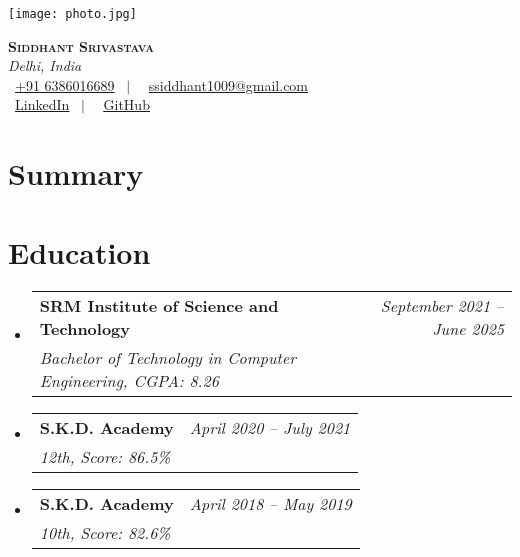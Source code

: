 \documentclass[a4paper,11pt]{article}
\makeatletter
\newcommand{\resumeSubheading}[4]{
    \vspace{-2pt}\item
        \begin{tabular*}{0.97\textwidth}[t]{l@{\extracolsep{\fill}}r}
            \textbf{#1} & #2 \\
            \textit{\small#3} & \textit{\small #4} \\
        \end{tabular*}\vspace{-10pt} %
}
\newcommand{\resumeSubHeadingListStart}{\begin{itemize}[leftmargin=0.15in, label={}]}
\newcommand{\resumeSubHeadingListEnd}{\end{itemize}}
\makeatother
\begin{document}

\begin{minipage}[c]{0.20\textwidth}
        \centering
        \texttt{[image: photo.jpg]} %
\end{minipage}%
\vrule width 1pt %
\hspace{10pt} %
\begin{minipage}[c]{0.7\textwidth}
        \raggedright %
        {\Huge \textbf{\scshape Siddhant Srivastava}} \\[7pt] %
        \textit{Delhi, India} \\[9pt] %
        \faPhone \ \href{tel:+916386016689}{+91 6386016689} \, $|$ \,
        \faEnvelope \ \href{mailto:ssiddhant1009@gmail.com}{ssiddhant1009@gmail.com} \\[5pt] %
        \faLinkedinSquare \ \href{https://linkedin.com/in/siddhant-srivastava-}{\underline{LinkedIn}} \, $|$ \,
        \faGithub \ \href{https://github.com/sidd1092}{\underline{GitHub}}
\end{minipage}

\section{Summary}
\begin{itemize}[leftmargin=0.15in, label={}]
     \small{\item{
    }}
\end{itemize}

\section{Education}
    \resumeSubHeadingListStart
        \resumeSubheading
            {SRM Institute of Science and Technology}{\textit{\large September 2021 --  June 2025}}
            {Bachelor of Technology in Computer Engineering, \large  CGPA: 8.26}{}
        \resumeSubheading
            {S.K.D. Academy}{\textit{ April 2020 -- July 2021}}
            {12th, \large Score: 86.5\%}{}
        \resumeSubheading
            {S.K.D. Academy}{\textit{April 2018 -- May 2019}}
            {10th, \large Score: 82.6\%}{}
    \resumeSubHeadingListEnd
\end{document}
